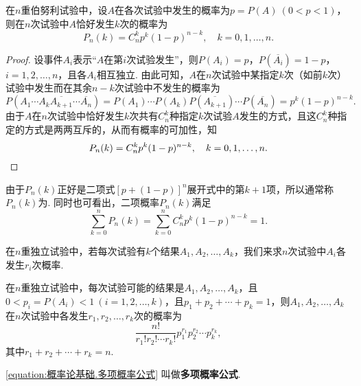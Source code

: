 \begin{theorem}[二项概率]
在\(n\)重伯努利试验中，设\(A\)在各次试验中发生的概率为\(p = P(A)\ (0 < p < 1)\)，则在\(n\)次试验中\(A\)恰好发生\(k\)次的概率为\begin{equation}
P_n(k) = C_n^k p^k (1-p)^{n-k}, \quad k=0,1,\dotsc,n.
\end{equation}
\begin{proof}
设事件\(A_i\)表示“\(A\)在第\(i\)次试验发生”，则\(P(A_i)=p\)，\(P(\overline{A_i})=1-p\)，\(i=1,2,\dotsc,n\)，且各\(A_i\)相互独立.
由此可知，\(A\)在\(n\)次试验中某指定\(k\)次（如前\(k\)次）试验中发生而在其余\(n-k\)次试验中不发生的概率为\[
P(A_1 \dotsm A_k \overline{A_{k+1}} \dotsm \overline{A_n})
= P(A_1) \dotsm P(A_k) P(\overline{A_{k+1}}) \dotsm P(\overline{A_n})
= p^k (1-p)^{n-k}.
\]由于\(A\)在\(n\)次试验中恰好发生\(k\)次共有\(C_n^k\)种指定\(k\)次试验\(A\)发生的方式，且这\(C_n^k\)种指定的方式是两两互斥的，从而有概率的可加性，知\[
P_n(k) = C_n^k p^k (1-p)^{n-k},
\quad k=0,1,\dotsc,n.
\qedhere
\]
\end{proof}
\end{theorem}
由于\(P_n(k)\)正好是二项式\([p+(1-p)]^n\)展开式中的第\(k+1\)项，所以通常称\(P_n(k)\)为.
同时也可看出，二项概率\(P_n(k)\)满足\begin{equation}
\sum\limits_{k=0}^n P_n(k)
= \sum\limits_{k=0}^n C_n^k p^k (1-p)^{n-k} = 1.
\end{equation}

在\(n\)重独立试验中，若每次试验有\(k\)个结果\(A_1,A_2,\dotsc,A_k\)，我们来求\(n\)次试验中\(A_i\)各发生\(r_i\)次概率.

\begin{theorem}[多项概率]
在\(n\)重独立试验中，每次试验可能的结果是\(A_1,A_2,\dotsc,A_k\)，且\(0 < p_i = P(A_i) < 1\ (i=1,2,\dotsc,k)\)，且\(p_1+p_2+\dotsb+p_k=1\)，则\(A_1,A_2,\dotsc,A_k\)在\(n\)次试验中各发生\(r_1,r_2,\dotsc,r_k\)次的概率为\begin{equation}\label{equation:概率论基础.多项概率公式}
\frac{n!}{r_1! r_2! \dotsm r_k!} p_1^{r_1} p_2^{r_2} \dotsm p_k^{r_k},
\end{equation}其中\(r_1+r_2+\dotsb+r_k=n\).
\end{theorem}
\cref{equation:概率论基础.多项概率公式} 叫做\textbf{多项概率公式}.
